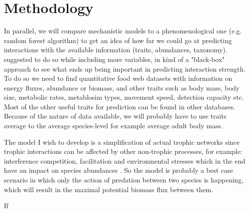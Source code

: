 \documentclass[english,12pt]{article}
\begin{document}
\section{Methodology}
In parallel, we will compare mechanistic models to a phenomenological one (e.g. random forest algorithm) to get an idea of how far we could go at predicting interactions with the available information (traits, abundances, taxonomy). \citet{Brose2019PreTra} suggested to do so while including more variables, in kind of a "black-box" approach to see what ends up being important in predicting interaction strength. To do so we need to find quantitative food web datasets with information on energy fluxes, abundance or biomass, and other traits such as body mass, body size, metabolic rates, metablosim types, movement speed, detection capacity etc. Most of the other useful traits for prediction can be found in other databases. Because of the nature of data available, we will probably have to use traits average to the average species-level for example average adult body mass. 

The model I wish to develop is a simplification of actual trophic networks since trophic interactions can be affected by other non-trophic processes, for example: interference competition, facilitation and environmental stresses which in the end have an impact on species abundances \citep{Berlow2004IntStr}. So the model is probably a best case scenario in which only the action of predation between two species is happening, which will result in the maximal potential biomass flux between them.

If 
\end{document}

